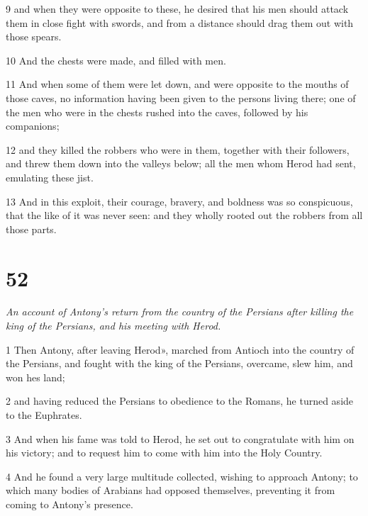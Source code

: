 \par 9 and when they were opposite to these, he desired that his men should attack them in close fight with swords, and from a distance should drag them out with those spears. 

\par 10 And the chests were made, and filled with men. 

\par 11 And when some of them were let down, and were opposite to the mouths of those caves, no information having been given to the persons living there; one of the men who were in the chests rushed into the caves, followed by his companions; 

\par 12 and they killed the robbers who were in them, together with their followers, and threw them down into the valleys below; all the men whom Herod had sent, emulating these jist. 

\par 13 And in this exploit, their courage, bravery, and boldness was so conspicuous, that the like of it was never seen: and they wholly rooted out the robbers from all those parts. 

\chapter{52} 

\par \textit{An account of Antony's return from the country of the Persians after killing the king of the Persians, and his meeting with Herod.}

\par 1 Then Antony, after leaving Herod», marched from Antioch into the country of the Persians, and fought with the king of the Persians, overcame, slew him, and won hes land; 

\par 2 and having reduced the Persians to obedience to the Romans, he turned aside to the Euphrates. 

\par 3 And when his fame was told to Herod, he set out to congratulate with him on his victory; and to request him to come with him into the Holy Country. 

\par 4 And he found a very large multitude collected, wishing to approach Antony; to which many bodies of Arabians had opposed themselves, preventing it from coming to Antony’s presence. 

